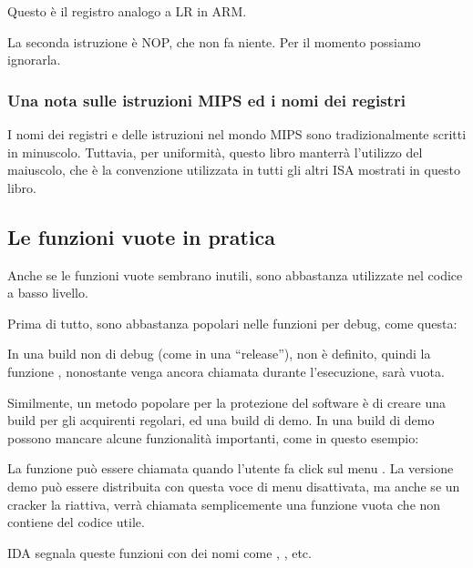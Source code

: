 Questo è il registro analogo a \ac{LR} in ARM.

La seconda istruzione è \ac{NOP}, che non fa niente.
Per il momento possiamo ignorarla.

\subsubsection{Una nota sulle istruzioni MIPS ed i nomi dei registri}

I nomi dei registri e delle istruzioni nel mondo MIPS sono tradizionalmente scritti in minuscolo.
Tuttavia, per uniformità, questo libro manterrà l'utilizzo del maiuscolo,
che è la convenzione utilizzata in tutti gli altri \ac{ISA} mostrati in questo libro.

\subsection{Le funzioni vuote in pratica}

Anche se le funzioni vuote sembrano inutili, sono abbastanza utilizzate nel codice a basso livello.

Prima di tutto, sono abbastanza popolari nelle funzioni per debug, come questa:



In una build non di debug (come in una ``release''),  non è definito,
quindi la funzione , nonostante venga ancora chiamata durante l'esecuzione,
sarà vuota.

Similmente, un metodo popolare per la protezione del software è di creare una build per gli acquirenti regolari, ed una build di demo.
In una build di demo possono mancare alcune funzionalità importanti, come in questo esempio:



La funzione  può essere chiamata quando l'utente fa click sul menu .
La versione demo può essere distribuita con questa voce di menu disattivata, ma anche se un cracker la riattiva,
verrà chiamata semplicemente una funzione vuota che non contiene del codice utile.

IDA segnala queste funzioni con dei nomi come , , etc.
